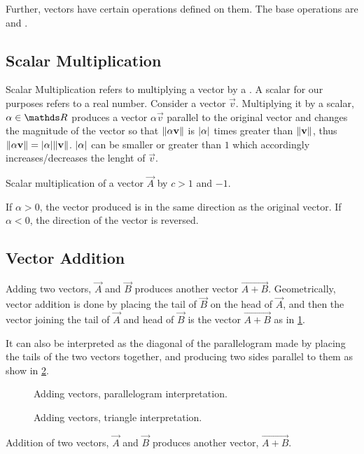 Further, vectors have certain operations defined on them. The base operations
are  and .

\subsection{Scalar Multiplication}  

Scalar Multiplication refers to multiplying a vector by a . A scalar
for our purposes refers to a real number. Consider a vector \(\vec{v}\).
Multiplying it by a scalar, \(\alpha \in \RR\) produces a vector 
\(\alpha\vec{v}\) parallel to the original vector and changes the magnitude of the vector so that
\(\norm{\alpha\mathbf{\boldsymbol{v}}}\) is \(\abs{\alpha}\) times greater than \(\norm{\mathbf{\boldsymbol{v}}}\), thus
\(\norm{\alpha \mathbf{\boldsymbol{v}}} = \abs{\alpha}\norm{\mathbf{\boldsymbol{v}}}\). \(\abs{\alpha}\) can 
be smaller or greater than \(1\) which accordingly increases/decreases the 
lenght of \(\vec{v}\).

\begin{marginfigure}
  \centering
  \caption{Scalar multiplication of a vector \(\vec{A}\) by \(c > 1\) and \(-1\).}
\end{marginfigure}

If \(\alpha > 0\), the vector produced is in the same direction as the original vector. If
\(\alpha < 0\), the direction of the vector is reversed. 

\subsection{Vector Addition}

Adding two vectors, \(\vec{A}\) and \(\vec{B}\) produces another 
vector \(\vec{A + B}\). Geometrically, vector addition is done by placing
the tail of \(\vec{B}\) on the head of \(\vec{A}\), and then the vector joining
the tail of \(\vec{A}\) and head of \(\vec{B}\) is the vector \(\vec{A + B}\) as 
in \cref{subfig: vectoradd1}.

It can also be interpreted as the diagonal of the parallelogram made by placing
the tails of the two vectors together, and producing two sides parallel to them as 
show in \cref{subfig: vectoradd2}.

\begin{marginfigure}
  \centering
  \begin{subfigure}[t]{\marginparwidth}
  \caption{Adding vectors, parallelogram interpretation.}
  \label{subfig: vectoradd1}
  \end{subfigure}
  \begin{subfigure}[t]{\marginparwidth}
  \caption{Adding vectors, triangle interpretation.}
  \label{subfig: vectoradd2}
  \end{subfigure}
  \caption{Addition of two vectors, \(\vec{A}\) and \(\vec{B}\) produces another
  vector, \(\vec{A + B}\).}
\end{marginfigure}

